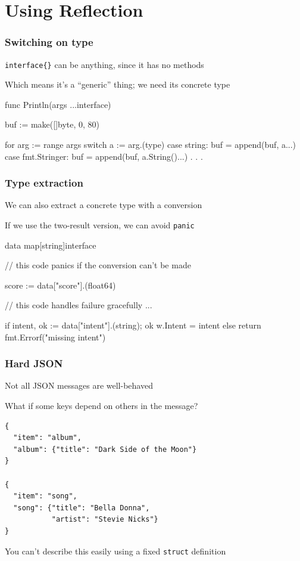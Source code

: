 \documentclass[handout,compress,t,11pt]{beamer}
\begin{document}

\section{Using Reflection}

\begin{frame}[fragile]
    \frametitle{Switching on type}
    \verb|interface{}| can be anything, since it has no methods \par
    \vspace{0.6\baselineskip}
    Which means it's a ``generic'' thing; we need its concrete type
    \vspace{0.6\baselineskip}
\begin{golang}
func Println(args ...interface{}) {
    buf := make([]byte, 0, 80)

    for arg := range args {
        switch a := arg.(type) {
            case string:
                buf = append(buf, a...)
            case fmt.Stringer:
                buf = append(buf, a.String()...)
            . . .
        }
    }
}
\end{golang}
\end{frame}

\begin{frame}[fragile]
    \frametitle{Type extraction}
    We can also extract a concrete type with a conversion \par
    \vspace{0.6\baselineskip}
    If we use the two-result version, we can avoid \verb|panic|
\begin{golang}
    data map[string]interface{}

    // this code panics if the conversion can't be made

	score := data["score"].(float64)

    // this code handles failure gracefully ...

	if intent, ok := data["intent"].(string); ok {
		w.Intent = intent
	} else {
		return fmt.Errorf("missing intent")
	}
\end{golang}
\end{frame}

\begin{frame}[fragile]
    \frametitle{Hard JSON}
    Not all JSON messages are well-behaved \par
    \vspace{0.4\baselineskip}
    What if some keys depend on others in the message?
{\small
\begin{verbatim}
{
  "item": "album", 
  "album": {"title": "Dark Side of the Moon"}
}

{
  "item": "song", 
  "song": {"title": "Bella Donna", 
           "artist": "Stevie Nicks"}
}
\end{verbatim}}
\vspace{\baselineskip}
You can't describe this easily using a fixed \verb|struct| definition
\end{frame}
\end{document}
